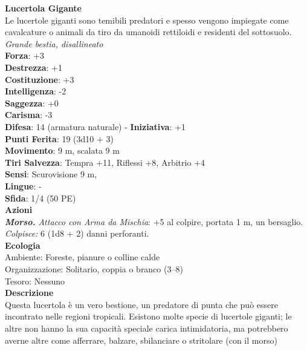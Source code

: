 \begin{multicols}{2}
\medskip\textbf{Lucertola Gigante}\\
Le lucertole giganti sono temibili predatori e spesso vengono impiegate come cavalcature o animali da tiro da umanoidi rettiloidi e residenti del sottosuolo.\\
\emph{Grande bestia, disallineato} \\
\textbf{Forza}: +3\\
\textbf{Destrezza}: +1\\
\textbf{Costituzione}: +3\\
\textbf{Intelligenza}: -2\\
\textbf{Saggezza}: +0\\
\textbf{Carisma}: -3\\
\textbf{Difesa}: 14 (armatura naturale) - \textbf{Iniziativa}: +1\\
\textbf{Punti Ferita}: 19 (3d10 + 3)\\
\textbf{Movimento}: 9 m, scalata 9 m\\
\textbf{Tiri Salvezza}: Tempra +11, Riflessi +8, Arbitrio +4 \\
\textbf{Sensi}: Scurovisione 9 m, \\
\textbf{Lingue}: -\\
\textbf{Sfida}: 1/4 (50 PE)\smallskip\\
\smallskip\textbf{Azioni}\\
\emph{\textbf{Morso.} Attacco con Arma da Mischia}: +5 al colpire, portata 1 m, un bersaglio.\\
\emph{Colpisce:} 6 (1d8 + 2) danni perforanti.\\
\textbf{Ecologia}\\
Ambiente: Foreste, pianure o colline calde\\
Organizzazione: Solitario, coppia o branco (3–8)\\
Tesoro: Nessuno\\
\textbf{Descrizione}\\

Questa lucertola è un vero bestione, un predatore di punta che può essere incontrato nelle regioni tropicali. Esistono molte specie di lucertole giganti; le altre non hanno la sua capacità speciale carica intimidatoria, ma potrebbero averne altre come afferrare, balzare, sbilanciare o stritolare (con il morso)\\


\end{multicols}
